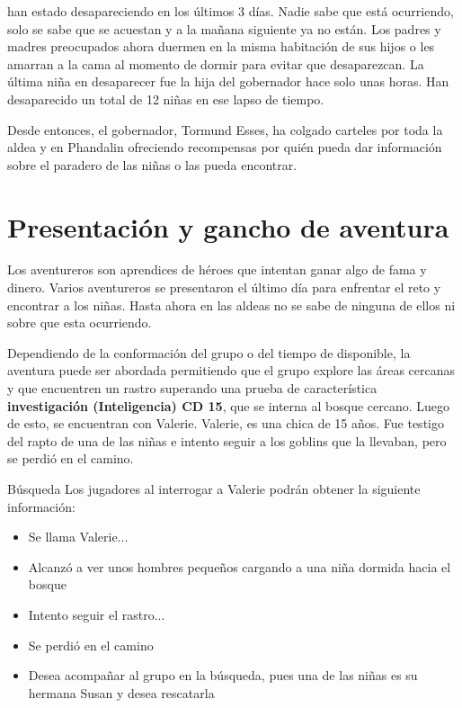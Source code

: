 \documentclass[10pt,twoside,twocolumn,openany]{dndbook}
\begin{document}
 han estado desapareciendo en los 
últimos 3 días. Nadie sabe que está ocurriendo, solo se sabe que se acuestan y a la mañana 
siguiente ya no están. Los padres y madres preocupados ahora duermen en la misma habitación de
sus hijos o les amarran a la cama al momento de dormir para evitar que desaparezcan. La última 
niña en desaparecer fue la hija del gobernador hace solo unas horas. Han desaparecido un total de 
12 niñas en ese lapso de tiempo.

Desde entonces, el gobernador, Tormund Esses, ha colgado carteles por toda la aldea y en Phandalin 
ofreciendo recompensas por quién pueda dar información sobre el paradero de las niñas o las pueda 
encontrar.

\section{Presentación y gancho de aventura}

Los aventureros son aprendices de héroes que intentan ganar algo de fama y dinero. Varios aventureros 
se presentaron el último día para enfrentar el reto y encontrar a los niñas. Hasta ahora en las 
aldeas no se sabe de ninguna de ellos ni sobre que esta ocurriendo.

Dependiendo de la conformación del grupo o del tiempo de disponible, la aventura puede ser abordada
permitiendo que el grupo explore las áreas cercanas y que encuentren un rastro superando una 
prueba de característica \textbf{investigación (Inteligencia) CD 15}, que se interna al bosque 
cercano. Luego de esto, se encuentran con Valerie. Valerie, es una chica de 15 años. Fue testigo del 
rapto de una de las niñas e intento seguir a los goblins que la llevaban, pero se perdió en el 
camino.

\begin{DndComment}{Búsqueda}
  Los jugadores al interrogar a Valerie podrán obtener la siguiente información:

  \begin{itemize}
    \item Se llama Valerie...
    \item Alcanzó a ver unos hombres pequeños cargando a una niña dormida hacia el bosque
    \item Intento seguir el rastro...
    \item Se perdió en el camino
    \item Desea acompañar al grupo en la búsqueda, pues una de las niñas es su hermana Susan
    y desea rescatarla
  \end{itemize}
  
\end{DndComment}
\end{document}
